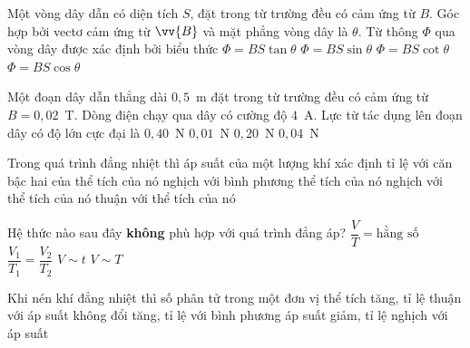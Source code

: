 	\begin{ex}%
		Một vòng dây dẫn có diện tích $S$, đặt trong từ trường đều có cảm ứng từ $B$. Góc hợp bởi vectơ cảm ứng từ $\vv{B}$ và mặt phẳng vòng dây là $\theta$. Từ thông $\Phi$ qua vòng dây được xác định bởi biểu thức
		\choice
		{$\Phi=BS\tan\theta$}
		{\True $\Phi=BS\sin\theta$}
		{$\Phi=BS\cot\theta$}
		{$\Phi=BS\cos\theta$}
	\end{ex}

	\begin{ex}%
		Một đoạn dây dẫn thẳng dài $0{,}5$~m đặt trong từ trường đều có cảm ứng từ $B=0{,}02$~T. Dòng điện chạy qua dây có cường độ $4$~A. Lực từ tác dụng lên đoạn dây có độ lớn cực đại là
		\choice
		{$0{,}40$~N}
		{$0{,}01$~N}
		{$0{,}20$~N}
		{\True $0{,}04$~N}
	\end{ex}

	\begin{ex}%
		Trong quá trình đẳng nhiệt thì áp suất của một lượng khí xác định tỉ lệ
		\choice
		{với căn bậc hai của thể tích của nó}
		{nghịch với bình phương thể tích của nó}
		{\True nghịch với thể tích của nó}
		{thuận với thể tích của nó}
	\end{ex}

	\begin{ex}%
		Hệ thức nào sau đây \textbf{không} phù hợp với quá trình đẳng áp?
		\choice
		{$\dfrac{V}{T}=\text{hằng số}$}
		{$\dfrac{V_1}{T_1}=\dfrac{V_2}{T_2}$}
		{\True $V\sim t$}
		{$V\sim T$}
	\end{ex}

	\begin{ex}%
		Khi nén khí đẳng nhiệt thì số phân tử trong một đơn vị thể tích
		\choice
		{\True tăng, tỉ lệ thuận với áp suất}
		{không đổi}
		{tăng, tỉ lệ với bình phương áp suất}
		{giảm, tỉ lệ nghịch với áp suất}
	\end{ex}


